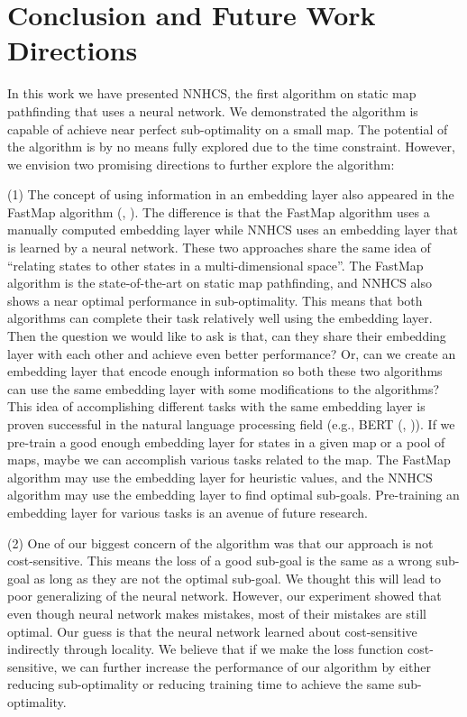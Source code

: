 \documentclass[letterpaper]{article}
\newcommand{\citea}[1]{(\citeauthor{#1}, \citeyear{#1})}
\numberwithin{equation}{section}
\numberwithin{theorem}{section}
\numberwithin{lemma}{section}
\numberwithin{df}{section}
\begin{document}
    \section{Conclusion and Future Work Directions}\label{sec:future-work}

    In this work we have presented NNHCS, the first algorithm on static map pathfinding that uses a neural network.
    We demonstrated the algorithm is capable of achieve near perfect sub-optimality on a small map.
    The potential of the algorithm is by no means fully explored due to the time constraint.
    However, we envision two promising directions to further explore the algorithm:

    (1) The concept of using information in an embedding layer also appeared in the FastMap algorithm \citea{fastmap}.
    The difference is that the FastMap algorithm uses a manually computed embedding layer while NNHCS uses an embedding layer that is learned by a neural network.
    These two approaches share the same idea of ``relating states to other states in a multi-dimensional space''.
    The FastMap algorithm is the state-of-the-art on static map pathfinding, and NNHCS also shows a near optimal performance in sub-optimality.
    This means that both algorithms can complete their task relatively well using the embedding layer.
    Then the question we would like to ask is that, can they share their embedding layer with each other and achieve even better performance?
    Or, can we create an embedding layer that encode enough information so both these two algorithms can use the same embedding layer with some modifications to the algorithms?
    This idea of accomplishing different tasks with the same embedding layer is proven successful in the natural language processing field (e.g., BERT \citea{bert}).
    If we pre-train a good enough embedding layer for states in a given map or a pool of maps, maybe we can accomplish various tasks related to the map.
    The FastMap algorithm may use the embedding layer for heuristic values, and the NNHCS algorithm may use the embedding layer to find optimal sub-goals.
    Pre-training an embedding layer for various tasks is an avenue of future research.

    (2) One of our biggest concern of the algorithm was that our approach is not cost-sensitive.
    This means the loss of a good sub-goal is the same as a wrong sub-goal as long as they are not the optimal sub-goal.
    We thought this will lead to poor generalizing of the neural network.
    However, our experiment showed that even though neural network makes mistakes, most of their mistakes are still optimal.
    Our guess is that the neural network learned about cost-sensitive indirectly through locality.
    We believe that if we make the loss function cost-sensitive,
    we can further increase the performance of our algorithm by either reducing sub-optimality or reducing training time to achieve the same sub-optimality.
\end{document}
